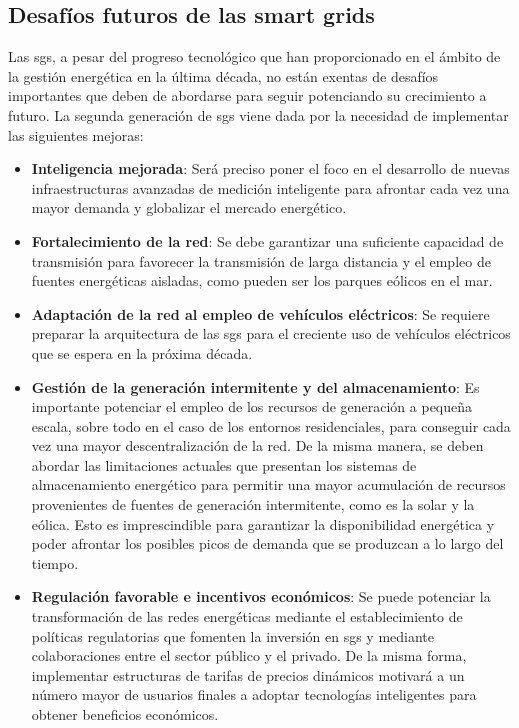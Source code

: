 






\subsection{Desafíos futuros de las smart grids}

Las \gls{sg}s, a pesar del progreso tecnológico que han proporcionado en el ámbito de la gestión energética en la última década, no están exentas de desafíos importantes que deben de abordarse para seguir potenciando su crecimiento a futuro. La segunda generación de \gls{sg}s viene dada por la necesidad de implementar las siguientes mejoras: \cite{smartgrid_overview} \cite{ioe}

\begin{itemize}
  \item \textbf{Inteligencia mejorada}: Será preciso poner el foco en el desarrollo de nuevas infraestructuras avanzadas de medición inteligente para afrontar cada vez una mayor demanda y globalizar el mercado energético.
  \item \textbf{Fortalecimiento de la red}: Se debe garantizar una suficiente capacidad de transmisión para favorecer la transmisión de larga distancia y el empleo de fuentes energéticas aisladas, como pueden ser los parques eólicos en el mar.
  \item \textbf{Adaptación de la red al empleo de vehículos eléctricos}: Se requiere preparar la arquitectura de las \gls{sg}s para el creciente uso de vehículos eléctricos que se espera en la próxima década.
  \item \textbf{Gestión de la generación intermitente y del almacenamiento}: Es importante potenciar el empleo de los recursos de generación a pequeña escala, sobre todo en el caso de los entornos residenciales, para conseguir cada vez una mayor descentralización de la red. De la misma manera, se deben abordar las limitaciones actuales que presentan los sistemas de almacenamiento energético para permitir una mayor acumulación de recursos provenientes de fuentes de generación intermitente, como es la solar y la eólica. Esto es imprescindible para garantizar la disponibilidad energética y poder afrontar los posibles picos de demanda que se produzcan a lo largo del tiempo.
  \item \textbf{Regulación favorable e incentivos económicos}: Se puede potenciar la transformación de las redes energéticas mediante el establecimiento de políticas regulatorias que fomenten la inversión \cite{inversion} en \gls{sg}s y mediante colaboraciones entre el sector público y el privado. De la misma forma, implementar estructuras de tarifas de precios dinámicos motivará a un número mayor de usuarios finales a adoptar tecnologías inteligentes para obtener beneficios económicos. 
\end{itemize}


